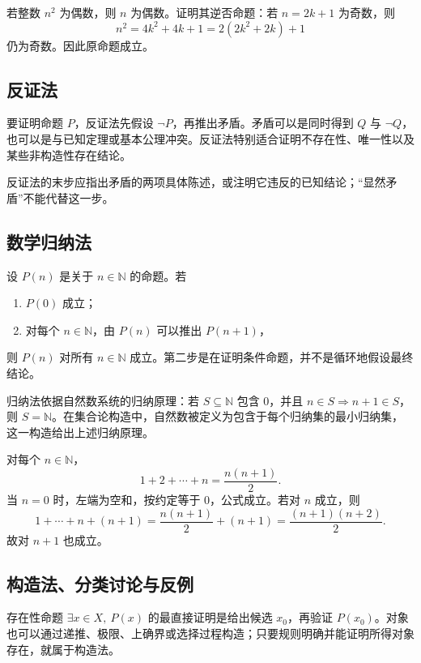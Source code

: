 \begin{example}
若整数 \(n^2\) 为偶数，则 \(n\) 为偶数。证明其逆否命题：若 \(n=2k+1\) 为奇数，则
\[
  n^2=4k^2+4k+1=2(2k^2+2k)+1
\]
仍为奇数。因此原命题成立。
\end{example}

\subsection{反证法}

要证明命题 \(P\)，反证法先假设 \(\neg P\)，再推出矛盾。矛盾可以是同时得到 \(Q\) 与 \(\neg Q\)，也可以是与已知定理或基本公理冲突。反证法特别适合证明不存在性、唯一性以及某些非构造性存在结论。

反证法的末步应指出矛盾的两项具体陈述，或注明它违反的已知结论；“显然矛盾”不能代替这一步。

\subsection{数学归纳法}

设 \(P(n)\) 是关于 \(n\in\mathbb N\) 的命题。若
\begin{enumerate}
  \item \(P(0)\) 成立；
  \item 对每个 \(n\in\mathbb N\)，由 \(P(n)\) 可以推出 \(P(n+1)\)，
\end{enumerate}
则 \(P(n)\) 对所有 \(n\in\mathbb N\) 成立。第二步是在证明条件命题，并不是循环地假设最终结论。

归纳法依据自然数系统的归纳原理：若 \(S\subseteq\mathbb N\) 包含 \(0\)，并且 \(n\in S\Rightarrow n+1\in S\)，则 \(S=\mathbb N\)。在集合论构造中，自然数被定义为包含于每个归纳集的最小归纳集，这一构造给出上述归纳原理。

\begin{example}
对每个 \(n\in\mathbb N\)，
\[
  1+2+\cdots+n=\frac{n(n+1)}2.
\]
当 \(n=0\) 时，左端为空和，按约定等于 \(0\)，公式成立。若对 \(n\) 成立，则
\[
  1+\cdots+n+(n+1)
  =\frac{n(n+1)}2+(n+1)
  =\frac{(n+1)(n+2)}2.
\]
故对 \(n+1\) 也成立。
\end{example}

\subsection{构造法、分类讨论与反例}

存在性命题 \(\exists x\in X,\ P(x)\) 的最直接证明是给出候选 \(x_0\)，再验证 \(P(x_0)\)。对象也可以通过递推、极限、上确界或选择过程构造；只要规则明确并能证明所得对象存在，就属于构造法。


